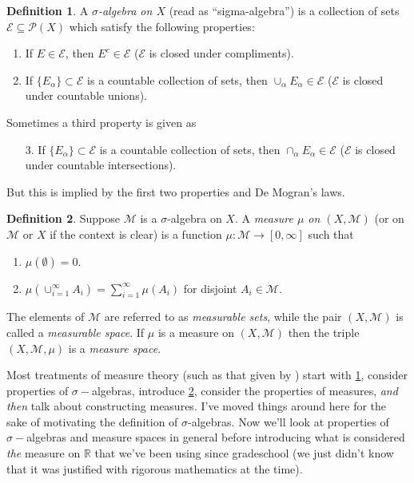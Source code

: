 \documentclass{article}
\newcommand{\R}{\mathbb{R}}
\theoremstyle{definition}
\newtheorem{definition}{Definition}[section]
\begin{document}
\begin{definition}\label{def14.2}
	A \textit{\color{red}$\sigma$-algebra on $X$} (read as ``sigma-algebra'') is a collection of sets $\mathcal E\subseteq \mathcal P(X)$ which satisfy the following properties:
	\begin{enumerate}
		\item If $E\in\mathcal E$, then $E^c\in \mathcal E$ ($\mathcal E$ is closed under compliments).
		\item If $\{E_\alpha\}\subset\mathcal E$ is a countable collection of sets, then $\cup_\alpha E_\alpha \in \mathcal E$ ($\mathcal E$ is closed under countable unions).
	\end{enumerate}
	Sometimes a third property is given as 
	\begin{enumerate}
		\item [3.] If $\{E_\alpha\}\subset\mathcal E$ is a countable collection of sets, then $\cap_\alpha E_\alpha \in \mathcal E$ ($\mathcal E$ is closed under countable intersections).
	\end{enumerate}
	But this is implied by the first two properties and De Mogran's laws.
\end{definition}	

\begin{definition}\label{def14.3}
	Suppose $\mathcal M$ is a $\sigma$-algebra on $X$. A \textit{\color{red}measure $\mu$ on $(X,\mathcal M)$} (or on $\mathcal M$ or $X$ if the context is clear) is a function $\mu:\mathcal M\to [0,\infty]$ such that 
	\begin{enumerate}
	\item $\mu(\emptyset) = 0$.
	\item $\mu(\cup_{i=1}^\infty A_i) = \sum_{i=1}^{\infty}\mu(A_i)$ for disjoint $A_i\in \mathcal M$.
	\end{enumerate}
	The elements of $\mathcal M$ are referred to as \textit{\color{red}measurable sets}, while the pair $(X,\mathcal M)$ is called a \textit{\color{red}measurable space}. If $\mu$ is a measure on $(X,\mathcal M)$ then the triple $(X,\mathcal M,\mu)$ is a  \textit{\color{red}measure space}.
\end{definition}	

Most treatments of measure theory (such as that given by \cite{folland2013real}) start with \cref{def14.2}, consider properties of $\sigma-$algebras,  introduce \cref{def14.3}, consider the properties of measures, \textit{and then} talk about constructing measures. I've moved things around here for the sake of motivating the definition of $\sigma$-algebras. Now we'll look at properties of $\sigma-$algebras and measure spaces in general before introducing what is considered \textit{the} measure on $\R$ that we've been using since gradeschool (we just didn't know that it was justified with rigorous mathematics at the time). 
  
\end{document}
